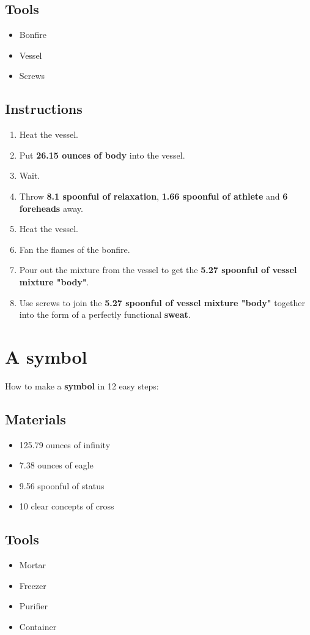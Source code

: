 \documentclass{article}
\begin{document}
\subsection{Tools}\begin{itemize}
\item 
Bonfire
\item 
Vessel
\item 
Screws
\end{itemize}
\subsection{Instructions}\begin{enumerate}
\item 
Heat the vessel.
\item 
Put \textbf{26.15 ounces of body} into the vessel.
\item 
Wait.
\item 
Throw \textbf{8.1 spoonful of relaxation}, \textbf{1.66 spoonful of athlete} and \textbf{6 foreheads} away.
\item 
Heat the vessel.
\item 
Fan the flames of the bonfire.
\item 
Pour out the mixture from the vessel to get the \textbf{5.27 spoonful of vessel mixture "body"}.
\item 
Use screws to join the \textbf{5.27 spoonful of vessel mixture "body"} together into the form of a perfectly functional \textbf{sweat}.
\end{enumerate}
\newpage
\section{A symbol}How to make a \textbf{symbol} in 12 easy steps:

\subsection{Materials}\begin{itemize}
\item 
125.79 ounces of infinity
\item 
7.38 ounces of eagle
\item 
9.56 spoonful of status
\item 
10 clear concepts of cross
\end{itemize}
\subsection{Tools}\begin{itemize}
\item 
Mortar
\item 
Freezer
\item 
Purifier
\item 
Container
\end{itemize}
\end{document}

